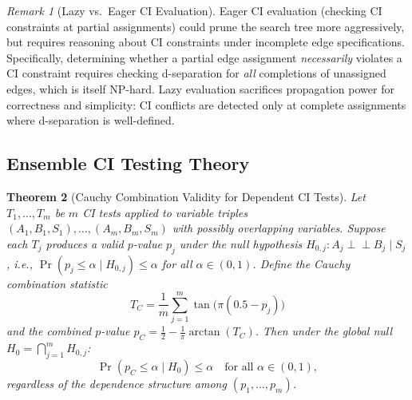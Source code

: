 \documentclass[11pt,a4paper]{article}
\newtheorem{theorem}{Theorem}[section]
\theoremstyle{definition}
\theoremstyle{remark}
\newtheorem{remark}[theorem]{Remark}
\newcommand{\CI}{\perp\!\!\!\perp}
\begin{document}
\begin{remark}[Lazy vs.\ Eager CI Evaluation]\label{rem:lazy_ci}
Eager CI evaluation (checking CI constraints at partial assignments) could
prune the search tree more aggressively, but requires reasoning about CI
constraints under incomplete edge specifications. Specifically, determining
whether a partial edge assignment \emph{necessarily} violates a CI constraint
requires checking d-separation for \emph{all} completions of unassigned edges,
which is itself NP-hard. Lazy evaluation sacrifices propagation power for
correctness and simplicity: CI conflicts are detected only at complete
assignments where d-separation is well-defined.
\end{remark}

\subsection{Ensemble CI Testing Theory}\label{sec:ci_theory}

\begin{theorem}[Cauchy Combination Validity for Dependent CI Tests]\label{thm:cauchy_valid}
Let $T_1, \ldots, T_m$ be $m$ CI tests applied to variable triples
$(A_1, B_1, S_1), \ldots, (A_m, B_m, S_m)$ with possibly overlapping
variables. Suppose each $T_j$ produces a valid $p$-value $p_j$ under
the null hypothesis $H_{0,j}: A_j \CI B_j \mid S_j$, i.e.,
$\Pr(p_j \leq \alpha \mid H_{0,j}) \leq \alpha$ for all
$\alpha \in (0,1)$. Define the Cauchy combination statistic
\[
  T_C = \frac{1}{m} \sum_{j=1}^{m} \tan\!\bigl(\pi(0.5 - p_j)\bigr)
\]
and the combined $p$-value $p_C = \frac{1}{2} - \frac{1}{\pi}\arctan(T_C)$.
Then under the global null $H_0 = \bigcap_{j=1}^{m} H_{0,j}$:
\[
  \Pr(p_C \leq \alpha \mid H_0) \leq \alpha \quad \text{for all }
  \alpha \in (0, 1),
\]
regardless of the dependence structure among $(p_1, \ldots, p_m)$.
\end{theorem}
\end{document}
